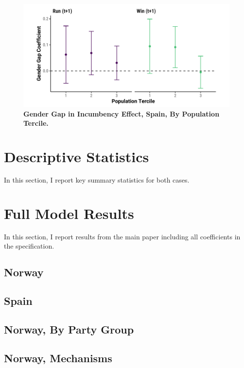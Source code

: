 \documentclass[12pt]{article}
\begin{document}
\begin{figure}[!htb]
    \centering
    \includegraphics[width = 0.8 \textwidth]{../output/figures/spain_tercile_robust.pdf}
    \caption{\textbf{Gender Gap in Incumbency Effect, Spain, By Population Tercile.}}
    \label{fig:spain_tercile_robust}
\end{figure}





\clearpage
\section{Descriptive Statistics}
\label{app:descriptive_statistics}

In this section, I report key summary statistics for both cases.





\clearpage
\section{Full Model Results}
\label{app:full_models}

In this section, I report results from the main paper including all coefficients in the specification.

\subsection{Norway}



\clearpage
\subsection{Spain}



\clearpage
\subsection{Norway, By Party Group}



\clearpage
\subsection{Norway, Mechanisms}


\end{document}
